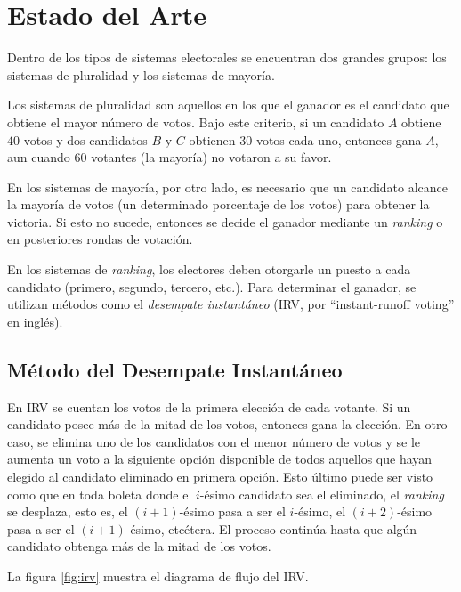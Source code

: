 \chapter{Estado del Arte}\label{chapter:state-of-the-art}

Dentro de los tipos de sistemas electorales se encuentran dos grandes grupos: los sistemas de pluralidad y los sistemas de mayor\'ia. 

Los sistemas de pluralidad son aquellos en los que el ganador es el candidato que obtiene el mayor n\'umero de votos. Bajo este  criterio, si un candidato $A$ obtiene $40$ votos y dos candidatos $B$ y $C$ obtienen $30$ votos cada uno, entonces gana $A$, aun cuando $60$ votantes (la mayor\'ia) no votaron a su favor. 

En los sistemas de mayor\'ia, por otro lado, es necesario que un candidato alcance la mayor\'ia de votos (un determinado porcentaje de los votos) para obtener la victoria. Si esto no sucede, entonces se decide el ganador mediante un \textit{ranking} o en posteriores rondas de votaci\'on. 

En los sistemas de \textit{ranking}, los electores deben otorgarle un puesto a cada candidato (primero, segundo, tercero, etc.).  Para determinar el ganador, se utilizan m\'etodos como el \textit{desempate instant\'aneo} (IRV, por ``instant-runoff voting'' en ingl\'es). 

\section{M\'etodo del Desempate Instant\'aneo}\label{sec:irv}
En IRV se cuentan los votos de la primera elecci\'on de cada votante. Si un candidato posee m\'as de la mitad de  los votos, entonces gana la elecci\'on. En otro caso, se elimina uno de los candidatos con el menor n\'umero de votos y se le aumenta un voto a la siguiente opci\'on disponible de todos aquellos que hayan elegido al candidato eliminado en primera opci\'on. Esto \'ultimo puede ser visto como que en toda boleta donde el $i$-\'esimo candidato sea el eliminado, el \textit{ranking} se desplaza, esto es, el $(i+1)$-\'esimo pasa a ser el $i$-\'esimo, el $(i+2)$-\'esimo pasa a ser el $(i+1)$-\'esimo, etc\'etera. El proceso contin\'ua hasta que alg\'un candidato obtenga m\'as de la mitad de los votos. 

La figura \ref{fig:irv} muestra el diagrama de flujo del IRV.

